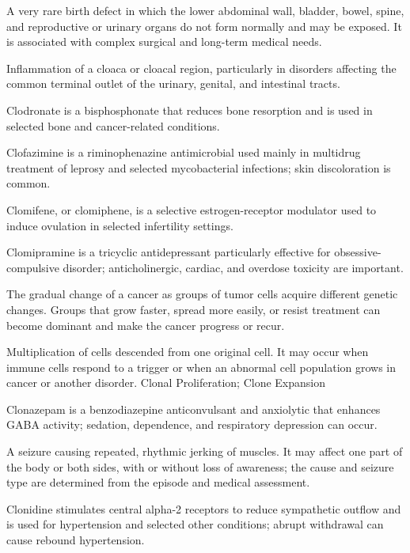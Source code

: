  A very rare birth defect in which the lower abdominal wall, bladder, bowel, spine, and reproductive or urinary organs do not form normally and may be exposed. It is associated with complex surgical and long-term medical needs.

 Inflammation of a cloaca or cloacal region, particularly in disorders affecting the
common terminal outlet of the urinary, genital, and intestinal tracts.

 Clodronate is a bisphosphonate that reduces bone resorption and is used in selected bone and cancer-related conditions.

 Clofazimine is a riminophenazine antimicrobial used mainly in multidrug treatment of leprosy and selected mycobacterial infections; skin discoloration is common.

 Clomifene, or clomiphene, is a selective estrogen-receptor modulator used to induce ovulation in selected infertility settings.

 Clomipramine is a tricyclic antidepressant particularly effective for obsessive-compulsive disorder; anticholinergic, cardiac, and overdose toxicity are important.

 The gradual change of a cancer as groups of tumor cells acquire different genetic changes. Groups that grow faster, spread more easily, or resist treatment can become dominant and make the cancer progress or recur.

 Multiplication of cells descended from one original cell. It may occur when immune cells respond to a trigger or when an abnormal cell population grows in cancer or another disorder.
\synonyms
Clonal Proliferation; Clone Expansion

 Clonazepam is a benzodiazepine anticonvulsant and anxiolytic that enhances GABA activity; sedation, dependence, and respiratory depression can occur.

 A seizure causing repeated, rhythmic jerking of muscles. It may affect one part of the body or both sides, with or without loss of awareness; the cause and seizure type are determined from the episode and medical assessment.

 Clonidine stimulates central alpha-2 receptors to reduce sympathetic outflow and is used for hypertension and selected other conditions; abrupt withdrawal can cause rebound hypertension.


